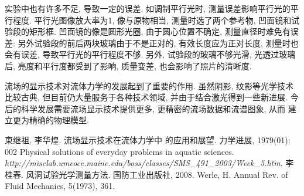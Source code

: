 \documentclass[12pt,a4paper,boxed,titlepage]{caspset}
\begin{document}
实验中也有许多不足, 导致一定的误差. 如调制平行光时, 测量误差影响平行光的平行程度. 平行光图像放大率为1, 像与原物相当, 测量时选了两个参考物, 凹面镜和试验段的矩形框. 凹面镜的像是圆形光圈, 由于圆心位置不确定, 测量直径时难免有误差: 另外试验段的前后两块玻璃由于不是正对的, 有效长度应为正对长度, 测量时也会有误差, 导致平行光的平行程度不够. 另外, 试验段的玻璃不够光滑, 光透过玻璃后, 亮度和平行度都受到了影响, 质量变差, 也会影响了照片的清晰度.

流场的显示技术对流体力学的发展起到了重要的作用.  虽然阴影, 纹影等光学技术比较古典, 但目前仍大量服务于各种技术领域, 并由于结合激光得到一些新进展. 今后的科学发展需要流场显示技术提供更多, 更精密的流场数据和流谱图象, 从而
建立更为精确的物理模型.



\begin{thebibliography}{99}
 束继祖, 李华煌. 流场显示技术在流体力学中
的应用和展望. 力学进展, 1979(01): 002
 Physical solutions of everyday problems in aquatic sciences.\\
 \textit{http://misclab.umeoce.maine.edu/boss/classes/SMS\_491\_2003/Week\_5.htm}.
 李桂春. 风洞试验光学测量方法. 国防工业出版社, 2008.
Werle, H. Annual Rev. of Fluid Mechanics, 5(1973), 361.
\end{thebibliography}
\end{document}
